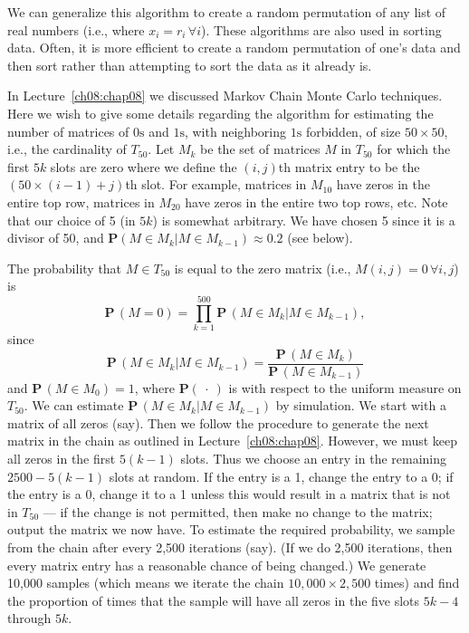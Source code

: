 \documentclass{stml-l}
\theoremstyle{definition}
\numberwithin{equation}{chapter}
\numberwithin{figure}{chapter}
\numberwithin{figure}{section}
\begin{document}
We can generalize this algorithm to create a random permutation of
any list of real numbers (i.e., where $x_{i}=r_{i}\,\forall i$).
These algorithms are also used in sorting data. Often, it is more
efficient to create a random permutation of one's data and then sort
rather than attempting to sort the data as it already is.

In Lecture~\ref{ch08:chap08} we discussed Markov Chain Monte Carlo
techniques. Here we wish to give some details regarding the
algorithm for estimating the number of matrices of $0\mathrm{s}$ and
$1\mathrm{s}$, with neighboring $1\mathrm{s}$ forbidden, of size
$50\times 50$, i.e., the cardinality of $T_{50}$. Let $M_{k}$ be the
set of matrices $M$ in $T_{50}$ for which the first $5k$ slots are
zero where we define the $(i,j)$th matrix entry to be the
$(50\times(i-1)+j)$th slot. For example, matrices in $M_{10}$ have
zeros in the entire top row, matrices in $M_{20}$ have zeros in the
entire two top rows, etc. Note that our choice of 5 (in $5k$) is
somewhat arbitrary. We have chosen 5 since it is a divisor of 50,
and $\mathbf{P}(M\in M_{k}|M\in M_{k-1})\approx 0.2$ (see below).

The probability that $M\in T_{50}$ is equal to the zero matrix
(i.e., $M(i,j)=0\,\forall i,j$) is
\begin{equation*}
\mathbf{P}\,(M=0)=\prod_{k=1}^{500}\mathbf{P}\,(M\in M_{k}|M\in
M_{k-1}),
\end{equation*}
since
\begin{equation*}
\mathbf{P}\,(M\in M_{k}|M\in M_{k-1})=\frac{\mathbf{P}\,(M\in
M_{k})}{\mathbf{P}\,(M\in M_{k-1})}
\end{equation*}
and $\mathbf{P}\,(M\in M_{0})=1$, where $\mathbf{P}(\ \cdot\ )$ is
with respect to the uniform measure on $T_{50}$. We can estimate
$\mathbf{P}\,(M\in M_{k}|M\in M_{k-1})$ by simulation. We start with a
matrix of all zeros (say). Then we follow the procedure to generate
the next matrix in the chain as outlined in
Lecture~\ref{ch08:chap08}. However, we must keep all zeros in the
first $5(k-1)$ slots. Thus we choose an entry in the remaining
$2500-5(k-1)$ slots at random. If the entry is a 1, change the entry
to a $0$; if the entry is a $0$, change it to a 1 unless this would
result in a matrix that is not in $T_{50}$ --- if the change is not
permitted, then make no change to the matrix; output the matrix we
now have. To estimate the required probability, we sample from the
chain after every 2,500 iterations (say). (If we do 2,500
iterations, then every matrix entry has a reasonable chance of being
changed.) We generate 10,000 samples (which means we iterate the
chain $10,000\times 2,500$ times) and find the proportion of times
that the sample will have all zeros in the five slots $5k-4$ through
$5k$.
\end{document}

